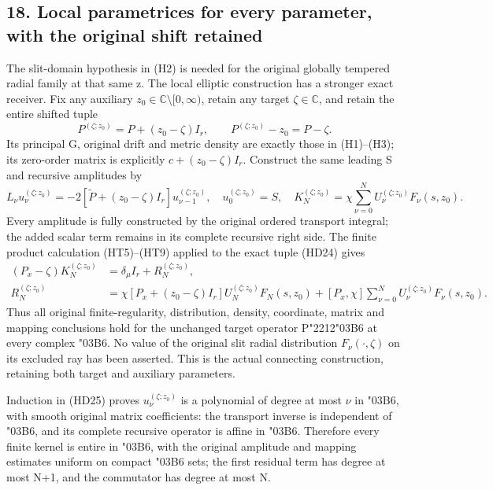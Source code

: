 \documentclass[
  11pt,
]{article}
\begin{document}
\subsection{18. Local parametrices for every parameter, with the
original shift
retained}\label{local-parametrices-for-every-parameter-with-the-original-shift-retained}

The slit-domain hypothesis in (H2) is needed for the original globally
tempered radial family at that same z. The local elliptic construction
has a stronger exact receiver. Fix any auxiliary
\(z_0\in\mathbb C\setminus[0,\infty)\), retain any target
\(\zeta\in\mathbb C\), and retain the entire shifted tuple \[
P^{(\zeta;z_0)}=P+(z_0-\zeta)I_r,
\qquad
P^{(\zeta;z_0)}-z_0=P-\zeta.
\tag{HD24}
\] Its principal G, original drift and metric density are exactly those
in (H1)--(H3); its zero-order matrix is explicitly \(c+(z_0-\zeta)I_r\).
Construct the same leading S and recursive amplitudes by \[
L_\nu u_\nu^{(\zeta;z_0)}
       =-2[\widetilde P+(z_0-\zeta)I_r]
                                      u_{\nu-1}^{(\zeta;z_0)},
\quad u_0^{(\zeta;z_0)}=S,
\quad
K_N^{(\zeta;z_0)}=
 \chi\sum_{\nu=0}^NU_\nu^{(\zeta;z_0)}F_\nu(s,z_0).
\tag{HD25}
\] Every amplitude is fully constructed by the original ordered
transport integral; the added scalar term remains in its complete
recursive right side. The finite product calculation (HT5)--(HT9)
applied to the exact tuple (HD24) gives \[
\begin{split}
(P_x-\zeta)K_N^{(\zeta;z_0)}
 &=\delta_\mu I_r+R_N^{(\zeta;z_0)},\\
R_N^{(\zeta;z_0)}
 &=\chi[P_x+(z_0-\zeta)I_r]U_N^{(\zeta;z_0)}F_N(s,z_0)
   +[P_x,\chi]\sum_{\nu=0}^NU_\nu^{(\zeta;z_0)}F_\nu(s,z_0).
\end{split}
\tag{HD26}
\] Thus all original finite-regularity, distribution, density,
coordinate, matrix and mapping conclusions hold for the unchanged target
operator P{\ReaderSymbols\char"2212}{\ReaderSymbols\char"03B6} at every complex {\ReaderSymbols\char"03B6}. No value of the original slit radial
distribution \(F_\nu(\cdot,\zeta)\) on its excluded ray has been
asserted. This is the actual connecting construction, retaining both
target and auxiliary parameters.

Induction in (HD25) proves \(u_\nu^{(\zeta;z_0)}\) is a polynomial of
degree at most \ensuremath{\nu} in {\ReaderSymbols\char"03B6}, with smooth original matrix coefficients: the
transport inverse is independent of {\ReaderSymbols\char"03B6}, and its complete recursive
operator is affine in {\ReaderSymbols\char"03B6}. Therefore every finite kernel is entire in {\ReaderSymbols\char"03B6},
with the original amplitude and mapping estimates uniform on compact {\ReaderSymbols\char"03B6}
sets; the first residual term has degree at most N+1, and the commutator
has degree at most N.
\end{document}
